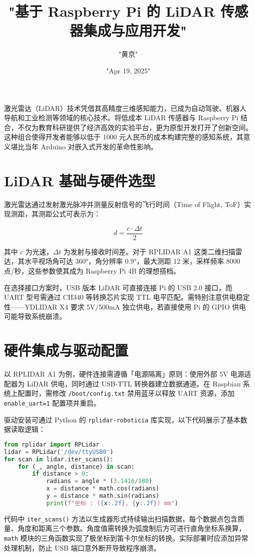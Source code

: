 \title{"基于 Raspberry Pi 的 LiDAR 传感器集成与应用开发"}
\author{"黄京"}
\date{"Apr 19, 2025"}
\maketitle
激光雷达（LiDAR）技术凭借其高精度三维感知能力，已成为自动驾驶、机器人导航和工业检测等领域的核心技术。将低成本 LiDAR 传感器与 Raspberry Pi 结合，不仅为教育科研提供了经济高效的实验平台，更为原型开发打开了创新空间。这种组合使得开发者能够以低于 1000 元人民币的成本构建完整的感知系统，其意义堪比当年 Arduino 对嵌入式开发的革命性影响。\par
\chapter{LiDAR 基础与硬件选型}
激光雷达通过发射激光脉冲并测量反射信号的飞行时间（Time of Flight, ToF）实现测距，其测距公式可表示为：\par
$$d = \frac{c \cdot \Delta t}{2}$$\par
其中 $c$ 为光速，$\Delta t$ 为发射与接收时间差。对于 RPLIDAR A1 这类二维扫描雷达，其水平视场角可达 360°，角分辨率 0.9°，最大测距 12 米，采样频率 8000 点/秒，这些参数使其成为 Raspberry Pi 4B 的理想搭档。\par
在选择接口方案时，USB 版本 LiDAR 可直接连接 Pi 的 USB 2.0 接口，而 UART 型号需通过 CH340 等转换芯片实现 TTL 电平匹配。需特别注意供电稳定性——YDLIDAR X4 要求 5V/500mA 独立供电，若直接使用 Pi 的 GPIO 供电可能导致系统崩溃。\par
\chapter{硬件集成与驱动配置}
以 RPLIDAR A1 为例，硬件连接需遵循「电源隔离」原则：使用外部 5V 电源适配器为 LiDAR 供电，同时通过 USB-TTL 转换器建立数据通道。在 Raspbian 系统上配置时，需修改 \verb!/boot/config.txt! 禁用蓝牙以释放 UART 资源，添加 \verb!enable_uart=1! 配置项并重启。\par
驱动安装可通过 Python 的 \verb!rplidar-roboticia! 库实现，以下代码展示了基本数据读取逻辑：\par
\begin{lstlisting}[language=python]
from rplidar import RPLidar
lidar = RPLidar('/dev/ttyUSB0')
for scan in lidar.iter_scans():
    for (_, angle, distance) in scan:
        if distance > 0:
            radians = angle * (3.1416/180)
            x = distance * math.cos(radians)
            y = distance * math.sin(radians)
            print(f"坐标 : ({x:.2f}, {y:.2f}) mm")
\end{lstlisting}
代码中 \verb!iter_scans()! 方法以生成器形式持续输出扫描数据，每个数据点包含质量、角度和距离三个参数。角度值需转换为弧度制后方可进行直角坐标系换算，\verb!math! 模块的三角函数实现了极坐标到笛卡尔坐标的转换。实际部署时应添加异常处理机制，防止 USB 端口意外断开导致程序崩溃。\par
